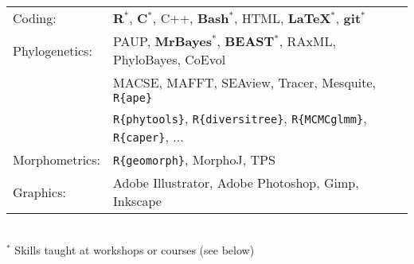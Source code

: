 \documentclass[10pt,a4paper]{article}
\begin{document}
{\bigskip

\begin{tabular}{ll}
Coding: & \textbf{{R}$^{*}$}, \textbf{C$^{*}$}, C++, \textbf{Bash$^{*}$}, HTML, \textbf{\LaTeX$^{*}$}, \textbf{git$^{*}$}\\[1.5ex]
Phylogenetics: & PAUP, \textbf{MrBayes$^{*}$}, \textbf{BEAST$^{*}$}, RAxML, PhyloBayes, CoEvol \\
& MACSE, MAFFT, SEAview, Tracer, Mesquite, \texttt{R\{ape\}} \\
& \texttt{R\{phytools\}}, \texttt{R\{diversitree\}}, \texttt{R\{MCMCglmm\}}, \texttt{R\{caper\}}, ... \\[1.5ex]
Morphometrics: & \texttt{R\{geomorph\}}, MorphoJ, TPS \\[1.5ex]
Graphics: & Adobe Illustrator, Adobe Photoshop, Gimp, Inkscape\\[1.5ex]
\end{tabular} \\
$^{*}$ Skills taught at workshops or courses (see below)
\bigskip

}
\end{document}
